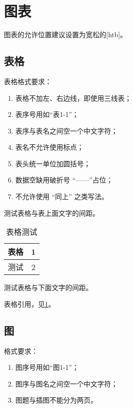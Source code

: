 \section{图表}

图表的允许位置建议设置为宽松的[htb]。

\subsection{表格}

表格格式要求：

\begin{enumerate}
	\item 表格不加左、右边线，即使用三线表；
	\item	表序号用如``表1-1''；
	\item 表序与表名之间空一个中文字符；
	\item 表名不允许使用标点；
	\item 表头统一单位加圆括号；
	\item 数据空缺用破折号 ``——''占位；
	\item 不允许使用 ``同上'' 之类写法。
\end{enumerate}

测试表格与表上面文字的间距。

\begin{table}[htb]
	\centering
	\caption{表格测试}
	\label{tab:a}
	\begin{tabular}{cc}
		\toprule
		表格 & 1 \\
		\midrule
		测试 & 2 \\
		\bottomrule
	\end{tabular}
\end{table}

测试表格与下面文字的间距。

表格引用，见\cref{tab:a}。

\subsection{图}

格式要求：

\begin{enumerate}
	\item	图序号用如``图1-1''；
	\item 图序与图名之间空一个中文字符；
	\item 图题与插图不能分为两页。
\end{enumerate}

